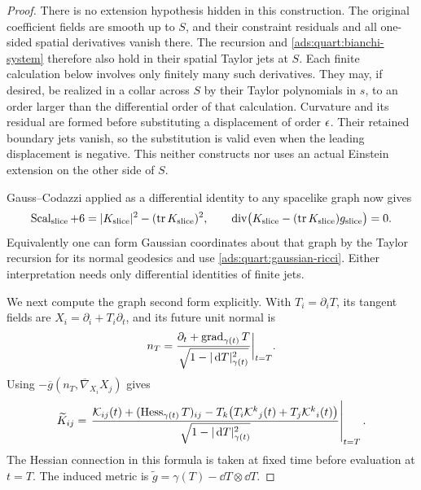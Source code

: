 \begin{proof}
There is no extension hypothesis hidden in this construction.  The
original coefficient fields are smooth up to \(S\), and their
constraint residuals and all one-sided spatial derivatives vanish
there.  The recursion and \eqref{ads:quart:bianchi-system} therefore also
hold in their spatial Taylor jets at \(S\).  Each finite calculation
below involves only finitely many such derivatives.  They may, if
desired, be realized in a collar across \(S\) by their Taylor
polynomials in \(s\), to an order larger than the differential order
of that calculation.  Curvature and its residual are formed before
substituting a displacement of order \(\epsilon\).  Their retained
boundary jets vanish, so the substitution is valid even when the
leading displacement is negative.  This neither constructs nor uses
an actual Einstein extension on the other side of \(S\).

Gauss--Codazzi applied as a differential identity to any spacelike
graph now gives
\begin{equation}
 \operatorname{Scal}_{\rm slice}+6
   =|K_{\rm slice}|^2-(\operatorname{tr} K_{\rm slice})^2,
 \qquad
 \operatorname{div}\bigl(K_{\rm slice}-(\operatorname{tr} K_{\rm slice})g_{\rm slice}\bigr)=0.
 \label{ads:quart:slice-constraints}
\end{equation}
Equivalently one can form Gaussian coordinates about that graph by
the Taylor recursion for its normal geodesics and use
\eqref{ads:quart:gaussian-ricci}.  Either interpretation needs only
differential identities of finite jets.

We next compute the graph second form explicitly.  With
\(T_i=\partial_iT\), its tangent fields are
\(X_i=\partial_i+T_i\partial_t\), and its future unit normal is
\[
 n_T=\frac{\partial_t+\operatorname{grad}_{\gamma(t)}T}
             {\sqrt{1-|\,\mathrm d T|_{\gamma(t)}^2}}\bigg|_{t=T}.
\]
Using \(-\overline g(n_T,\overline\nabla_{X_i}X_j)\) gives
\begin{equation}
 \widetilde K_{ij}
  =\left.
    \frac{\mathcal K_{ij}(t)+(\operatorname{Hess}_{\gamma(t)}T)_{ij}
       -T_k\bigl(T_i\mathcal K^k{}_j(t)
                 +T_j\mathcal K^k{}_i(t)\bigr)}
     {\sqrt{1-|\,\mathrm d T|_{\gamma(t)}^2}}
   \right|_{t=T}.
 \label{ads:quart:graph-k}
\end{equation}
The Hessian connection in this formula is taken at fixed time before
evaluation at \(t=T\).  The induced metric is
\(\widetilde g=\gamma(T)-\dd T\otimes\dd T\).


\end{proof}
